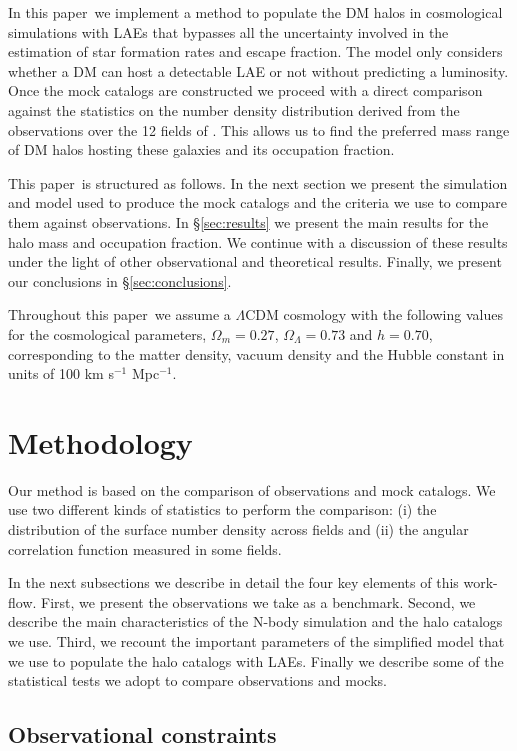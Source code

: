 \documentclass[usenatbib]{mn2e}
\newcommand{\documentname}{paper~}
\newcommand{\ly}{{\ifmmode{{\rm Ly}\alpha}\else{Ly$\alpha$~}\fi}}
\begin{document}
In this \documentname we implement a method to populate the DM halos
in cosmological simulations with LAEs that bypasses all the
uncertainty involved in the estimation of star formation rates and \ly escape
fraction. The model only considers whether a DM can host a
detectable LAE or not without predicting a \ly  luminosity. Once the
mock catalogs are constructed  we proceed with a direct comparison
against the statistics on the number density distribution derived from
 the observations over the 12 fields of \cite{Yamada2012}. This allows us 
to find the preferred mass range of DM halos hosting these galaxies
and its occupation fraction.


This \documentname is structured as follows. In the next section we present
the simulation and model used to produce the mock catalogs and the criteria
we use to compare them against observations. In \S \ref{sec:results} we
present the main results for the halo mass and occupation fraction. We
continue with a discussion of these results under the light of other
observational and theoretical results. Finally, we present our
conclusions in \S \ref{sec:conclusions}. 

Throughout this \documentname we assume a $\Lambda$CDM cosmology with the
following values for the cosmological parameters, $\Omega_{m}=0.27$,
$\Omega_{\Lambda}=0.73$ and $h=0.70$, corresponding to the matter
density, vacuum density and the Hubble constant in units of 100 km
s$^{-1}$ Mpc$^{-1}$. 

\section{Methodology}


Our method is based on the comparison of observations and mock
catalogs. We use two different kinds of statistics to perform the
comparison: (i) the distribution of the surface number density
across fields and (ii) the angular correlation function measured in
some fields.

In the next subsections we describe in detail the four key
elements of this work-flow. First, we present the observations we take
as a benchmark. Second, we describe the main characteristics of the
N-body simulation and the halo catalogs we use. Third, we recount the
important parameters of the simplified model that we use to populate
the halo catalogs with LAEs. Finally we describe some of the
statistical tests we adopt to compare observations and mocks.

\subsection{Observational constraints}
\end{document}
